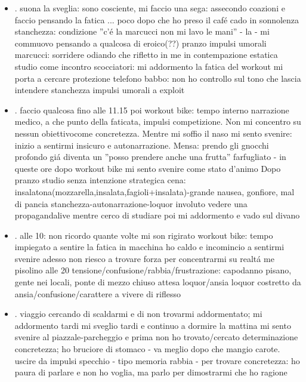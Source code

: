 \begin{itemize}
\item {}.
suona la sveglia: sono cosciente, mi faccio una sega: assecondo coazioni e faccio pensando la fatica ...
poco dopo che ho preso il caf\'e cado in sonnolenza stanchezza: condizione ''c'\'e la marcucci non mi lavo le mani'' - la  -
mi commuovo pensando a qualcosa di eroico(??)
pranzo impulsi umorali
marcucci: sorridere odiando che rifletto in me in contempazione estatica
studio come incontro scocciatori: mi addormento
la fatica del workout mi porta a cercare protezione
telefono babbo: non ho controllo sul tono che lascia intendere stanchezza
impulsi umorali a exploit
\item {}.
faccio qualcosa fino alle 11.15 poi workout bike: tempo interno narrazione medico, a che punto della faticata, impulsi competizione.
Non mi concentro su nessun obiettivocome concretezza.
Mentre mi soffio il naso mi sento svenire: inizio a sentirmi insicuro e autonarrazione.
Mensa: prendo gli gnocchi profondo gi\'a diventa un ''posso prendere anche una frutta'' farfugliato - in queste ore dopo workout bike mi sento svenire come stato d'animo
Dopo pranzo studio senza intenzione strategica
cena: insalatona(mozzarella,insalata,fagioli+insalata)-grande nausea, gonfiore, mal di pancia
stanchezza-autonarrazione-loquor involuto
vedere una propagandalive mentre cerco di studiare
poi mi addormento e vado sul divano
\item {}.
alle 10: non ricordo quante volte mi son rigirato
workout bike: tempo impiegato a sentire la fatica
in macchina ho caldo e incomincio a sentirmi svenire
adesso non riesco a trovare forza per concentrarmi su realt\'a me
pisolino alle 20
tensione/confusione/rabbia/frustrazione: capodanno pisano, gente nei locali, ponte di mezzo chiuso
attesa loquor/ansia loquor
costretto da ansia/confusione/carattere a vivere di riflesso
\item {}.
viaggio cercando di scaldarmi e di non trovarmi addormentato; mi addormento tardi 
mi sveglio tardi e continuo a dormire
la mattina mi sento svenire al piazzale-parcheggio e prima non ho trovato/cercato determinazione concretezza; ho bruciore di stomaco - va meglio dopo che mangio carote.
uscire da impulsi specchio - tipo memoria rabbia - per trovare concretezza: ho paura di parlare e non ho voglia, ma parlo per dimostrarmi che ho ragione

\end{itemize}
